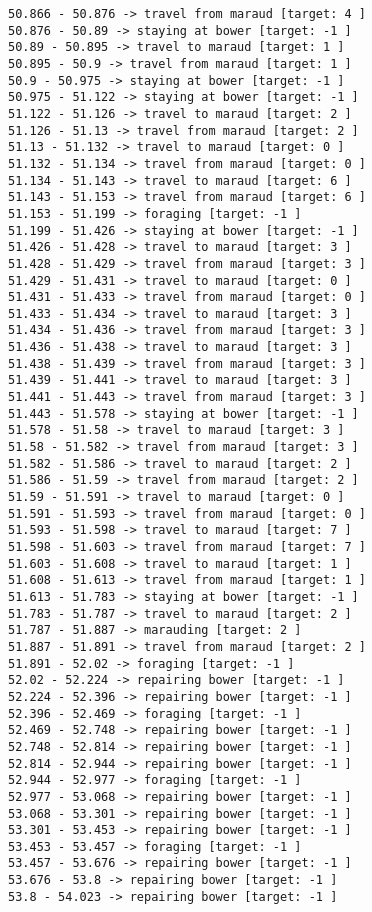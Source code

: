 \documentclass[11pt]{article}
\begin{document}
\begin{Verbatim}[commandchars=\\\{\}]
50.866 - 50.876 -> travel from maraud [target: 4 ]
50.876 - 50.89 -> staying at bower [target: -1 ]
50.89 - 50.895 -> travel to maraud [target: 1 ]
50.895 - 50.9 -> travel from maraud [target: 1 ]
50.9 - 50.975 -> staying at bower [target: -1 ]
50.975 - 51.122 -> staying at bower [target: -1 ]
51.122 - 51.126 -> travel to maraud [target: 2 ]
51.126 - 51.13 -> travel from maraud [target: 2 ]
51.13 - 51.132 -> travel to maraud [target: 0 ]
51.132 - 51.134 -> travel from maraud [target: 0 ]
51.134 - 51.143 -> travel to maraud [target: 6 ]
51.143 - 51.153 -> travel from maraud [target: 6 ]
51.153 - 51.199 -> foraging [target: -1 ]
51.199 - 51.426 -> staying at bower [target: -1 ]
51.426 - 51.428 -> travel to maraud [target: 3 ]
51.428 - 51.429 -> travel from maraud [target: 3 ]
51.429 - 51.431 -> travel to maraud [target: 0 ]
51.431 - 51.433 -> travel from maraud [target: 0 ]
51.433 - 51.434 -> travel to maraud [target: 3 ]
51.434 - 51.436 -> travel from maraud [target: 3 ]
51.436 - 51.438 -> travel to maraud [target: 3 ]
51.438 - 51.439 -> travel from maraud [target: 3 ]
51.439 - 51.441 -> travel to maraud [target: 3 ]
51.441 - 51.443 -> travel from maraud [target: 3 ]
51.443 - 51.578 -> staying at bower [target: -1 ]
51.578 - 51.58 -> travel to maraud [target: 3 ]
51.58 - 51.582 -> travel from maraud [target: 3 ]
51.582 - 51.586 -> travel to maraud [target: 2 ]
51.586 - 51.59 -> travel from maraud [target: 2 ]
51.59 - 51.591 -> travel to maraud [target: 0 ]
51.591 - 51.593 -> travel from maraud [target: 0 ]
51.593 - 51.598 -> travel to maraud [target: 7 ]
51.598 - 51.603 -> travel from maraud [target: 7 ]
51.603 - 51.608 -> travel to maraud [target: 1 ]
51.608 - 51.613 -> travel from maraud [target: 1 ]
51.613 - 51.783 -> staying at bower [target: -1 ]
51.783 - 51.787 -> travel to maraud [target: 2 ]
51.787 - 51.887 -> marauding [target: 2 ]
51.887 - 51.891 -> travel from maraud [target: 2 ]
51.891 - 52.02 -> foraging [target: -1 ]
52.02 - 52.224 -> repairing bower [target: -1 ]
52.224 - 52.396 -> repairing bower [target: -1 ]
52.396 - 52.469 -> foraging [target: -1 ]
52.469 - 52.748 -> repairing bower [target: -1 ]
52.748 - 52.814 -> repairing bower [target: -1 ]
52.814 - 52.944 -> repairing bower [target: -1 ]
52.944 - 52.977 -> foraging [target: -1 ]
52.977 - 53.068 -> repairing bower [target: -1 ]
53.068 - 53.301 -> repairing bower [target: -1 ]
53.301 - 53.453 -> repairing bower [target: -1 ]
53.453 - 53.457 -> foraging [target: -1 ]
53.457 - 53.676 -> repairing bower [target: -1 ]
53.676 - 53.8 -> repairing bower [target: -1 ]
53.8 - 54.023 -> repairing bower [target: -1 ]

\end{Verbatim}
\end{document}
